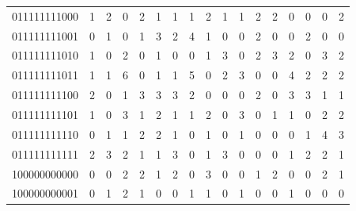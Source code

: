 \documentclass[10pt,a4paper]{article}
\begin{document}
\begin{longtable}{ |c|c|c|c|c|c|c|c|c|c|c|c|c|c|c|c|c| }
    011111111000              & 1                            & 2                                & 0                            & 2                              & 1   & 1   & 1   & 2   & 1   & 1   & 2   & 2   & 0   & 0   & 0   & 2   \\
    011111111001              & 0                            & 1                                & 0                            & 1                              & 3   & 2   & 4   & 1   & 0   & 0   & 2   & 0   & 0   & 2   & 0   & 0   \\
    011111111010              & 1                            & 0                                & 2                            & 0                              & 1   & 0   & 0   & 1   & 3   & 0   & 2   & 3   & 2   & 0   & 3   & 2   \\
    011111111011              & 1                            & 1                                & 6                            & 0                              & 1   & 1   & 5   & 0   & 2   & 3   & 0   & 0   & 4   & 2   & 2   & 2   \\
    011111111100              & 2                            & 0                                & 1                            & 3                              & 3   & 3   & 2   & 0   & 0   & 0   & 2   & 0   & 3   & 3   & 1   & 1   \\
    011111111101              & 1                            & 0                                & 3                            & 1                              & 2   & 1   & 1   & 2   & 0   & 3   & 0   & 1   & 1   & 0   & 2   & 2   \\
    011111111110              & 0                            & 1                                & 1                            & 2                              & 2   & 1   & 0   & 1   & 0   & 1   & 0   & 0   & 0   & 1   & 4   & 3   \\
    011111111111              & 2                            & 3                                & 2                            & 1                              & 1   & 3   & 0   & 1   & 3   & 0   & 0   & 0   & 1   & 2   & 2   & 1   \\
    100000000000              & 0                            & 0                                & 2                            & 2                              & 1   & 2   & 0   & 3   & 0   & 0   & 1   & 2   & 0   & 0   & 2   & 1   \\
    100000000001              & 0                            & 1                                & 2                            & 1                              & 0   & 0   & 1   & 1   & 0   & 1   & 0   & 0   & 1   & 0   & 0   & 0   \\

\end{longtable}
\end{document}
